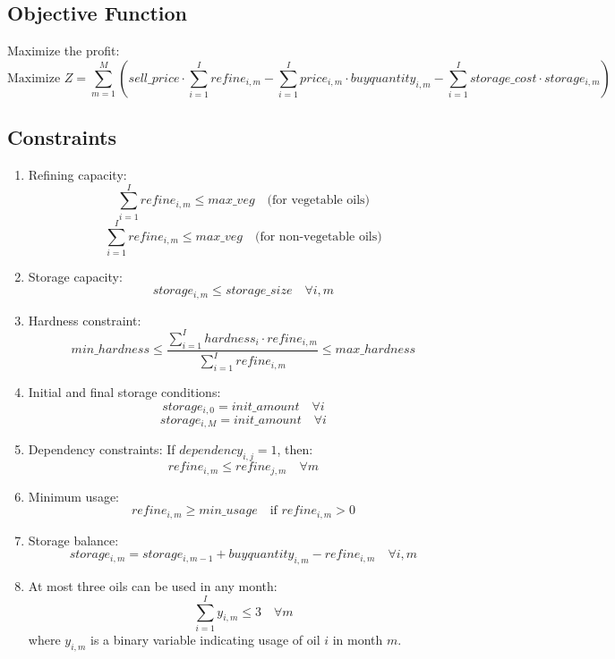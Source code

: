 \documentclass{article}
\begin{document}
\subsection*{Objective Function}
Maximize the profit:
\[
\text{Maximize } Z = \sum_{m=1}^{M} \left( sell\_price \cdot \sum_{i=1}^{I} refine_{i,m} - \sum_{i=1}^{I} price_{i,m} \cdot buyquantity_{i,m} - \sum_{i=1}^{I} storage\_cost \cdot storage_{i,m} \right)
\]

\subsection*{Constraints}
\begin{enumerate}
    \item Refining capacity:
    \[
    \sum_{i=1}^{I} refine_{i,m} \leq max\_veg \quad \text{(for vegetable oils)}
    \]
    \[
    \sum_{i=1}^{I} refine_{i,m} \leq max\_veg \quad \text{(for non-vegetable oils)}
    \]

    \item Storage capacity:
    \[
    storage_{i,m} \leq storage\_size \quad \forall i, m
    \]

    \item Hardness constraint:
    \[
    min\_hardness \leq \frac{\sum_{i=1}^{I} hardness_{i} \cdot refine_{i,m}}{\sum_{i=1}^{I} refine_{i,m}} \leq max\_hardness
    \]

    \item Initial and final storage conditions:
    \[
    storage_{i,0} = init\_amount \quad \forall i
    \]
    \[
    storage_{i,M} = init\_amount \quad \forall i
    \]

    \item Dependency constraints:
    If \( dependency_{i,j} = 1 \), then:
    \[
    refine_{i,m} \leq refine_{j,m} \quad \forall m
    \]

    \item Minimum usage:
    \[
    refine_{i,m} \geq min\_usage \quad \text{if } refine_{i,m} > 0
    \]

    \item Storage balance:
    \[
    storage_{i,m} = storage_{i,m-1} + buyquantity_{i,m} - refine_{i,m} \quad \forall i, m
    \]

    \item At most three oils can be used in any month:
    \[
    \sum_{i=1}^{I} y_{i,m} \leq 3 \quad \forall m
    \]
    where \( y_{i,m} \) is a binary variable indicating usage of oil \( i \) in month \( m \).
\end{enumerate}
\end{document}
